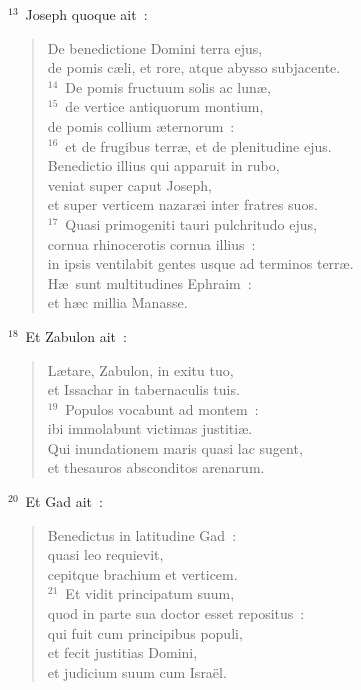 ${}^{13}$~Joseph quoque ait~: \begin{flushleft}\begin{verse}De benedictione Domini terra ejus,\\ de pomis c\ae li, et rore, atque abysso subjacente.\\
${}^{14}$~De pomis fructuum solis ac lun\ae ,\\
${}^{15}$~de vertice antiquorum montium,\\ de pomis collium \ae ternorum~:\\
${}^{16}$~et de frugibus terr\ae , et de plenitudine ejus.\\ Benedictio illius qui apparuit in rubo,\\ veniat super caput Joseph,\\ et super verticem nazar\ae i inter fratres suos.\\
${}^{17}$~Quasi primogeniti tauri pulchritudo ejus,\\ cornua rhinocerotis cornua illius~:\\ in ipsis ventilabit gentes usque ad terminos terr\ae .\\ H\ae\ sunt multitudines Ephraim~:\\ et h\ae c millia Manasse.\end{verse}\end{flushleft}


${}^{18}$~Et Zabulon ait~: \begin{flushleft}\begin{verse}L\ae tare, Zabulon, in exitu tuo,\\ et Issachar in tabernaculis tuis.\\
${}^{19}$~Populos vocabunt ad montem~:\\ ibi immolabunt victimas justiti\ae .\\ Qui inundationem maris quasi lac sugent,\\ et thesauros absconditos arenarum.\end{verse}\end{flushleft}


${}^{20}$~Et Gad ait~: \begin{flushleft}\begin{verse}Benedictus in latitudine Gad~:\\ quasi leo requievit,\\ cepitque brachium et verticem.\\
${}^{21}$~Et vidit principatum suum,\\ quod in parte sua doctor esset repositus~:\\ qui fuit cum principibus populi,\\ et fecit justitias Domini,\\ et judicium suum cum Isra\"el.\end{verse}\end{flushleft}


